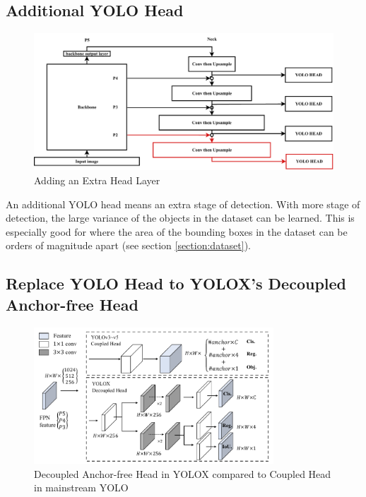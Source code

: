   \subsection{Additional YOLO Head}
  \begin{figure}[H]
    \centering
    \includegraphics[width=.9\textwidth]{figures/addmorehead.pdf}
    \caption{Adding an Extra Head Layer}
    \label{fig:addmorehead}
  \end{figure}
  An additional YOLO head means an extra stage of detection.
  With more stage of detection, the large variance of the objects in the dataset can be learned.
  This is especially good for \textcite{aot_dataset} where the area of the bounding boxes in the dataset
  can be orders of magnitude apart (see section \ref{section:dataset}).
  

  \subsection{Replace YOLO Head to YOLOX's Decoupled Anchor-free Head}
  \begin{figure}[H]
    \centering
    \includegraphics[width=0.8\textwidth]{figures/anchorfree-yolox.png}
    \caption{Decoupled Anchor-free Head in YOLOX compared to Coupled Head in mainstream YOLO}
    \label{fig:anchorfree}
  \end{figure}

